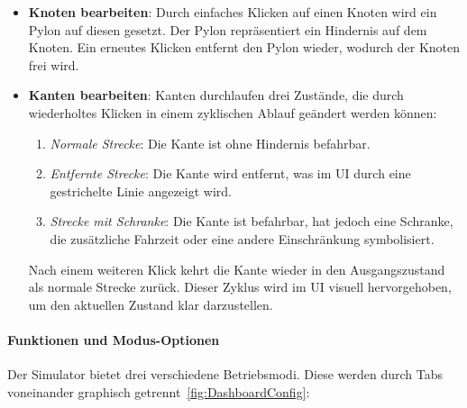 \documentclass[main.tex]{subfiles} %
\begin{document}
\begin{itemize}
    \item \textbf{Knoten bearbeiten}:  
    Durch einfaches Klicken auf einen Knoten wird ein Pylon auf diesen gesetzt. Der Pylon repräsentiert ein Hindernis auf dem Knoten. Ein erneutes Klicken entfernt den Pylon wieder, wodurch der Knoten frei wird.

    \item \textbf{Kanten bearbeiten}:  
    Kanten durchlaufen drei Zustände, die durch wiederholtes Klicken in einem zyklischen Ablauf geändert werden können:
    \begin{enumerate}
        \item \textit{Normale Strecke}: Die Kante ist ohne Hindernis befahrbar.
        \item \textit{Entfernte Strecke}: Die Kante wird entfernt, was im UI durch eine gestrichelte Linie angezeigt wird.
        \item \textit{Strecke mit Schranke}: Die Kante ist befahrbar, hat jedoch eine Schranke, die zusätzliche Fahrzeit oder eine andere Einschränkung symbolisiert.
    \end{enumerate}
    Nach einem weiteren Klick kehrt die Kante wieder in den Ausgangszustand als normale Strecke zurück. Dieser Zyklus wird im UI visuell hervorgehoben, um den aktuellen Zustand klar darzustellen.
\end{itemize}

\paragraph{Funktionen und Modus-Optionen}

Der Simulator bietet drei verschiedene Betriebsmodi. Diese werden durch Tabs voneinander graphisch getrennt~\ref{fig:DashboardConfig}:
\end{document}
